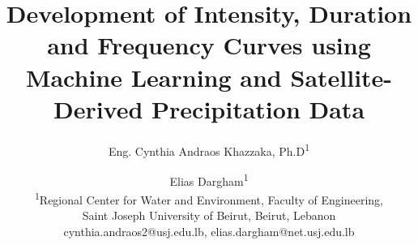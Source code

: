 \documentclass[
  12pt,
  a4paper,
  twocolumn,
]{article}
\author{Eng. Cynthia Andraos Khazzaka, Ph.D\textsuperscript{1} \and Elias Dargham\textsuperscript{1} \\
\textsuperscript{1}Regional Center for Water and Environment, Faculty of Engineering, \\
Saint Joseph University of Beirut, Beirut, Lebanon \\
cynthia.andraos2@usj.edu.lb, elias.dargham@net.usj.edu.lb}
\title{Development of Intensity, Duration and Frequency Curves using Machine Learning and Satellite-Derived Precipitation Data}
\date{}
\begin{document}
\onecolumn
\maketitle

\twocolumn







\onecolumn

\end{document}
